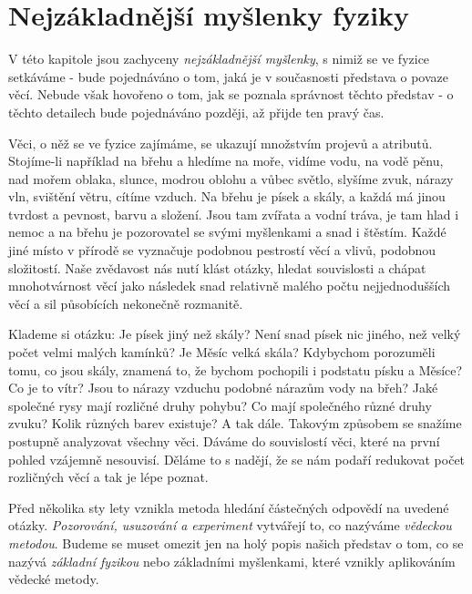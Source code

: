   \section{Nejzákladnější myšlenky fyziky}\label{fyz:IchapIsecII}
    V této kapitole jsou zachyceny \emph{nejzákladnější myšlenky}, s nimiž se ve fyzice setkáváme - 
    bude pojednáváno o tom, jaká je v současnosti představa o povaze věcí. Nebude však hovořeno o 
    tom, jak se poznala správnost těchto představ - o těchto detailech bude pojednáváno později, až 
    přijde ten pravý čas.

    Věci, o něž se ve fyzice zajímáme, se ukazují množstvím projevů a atributů. Stojíme-li 
    například na břehu a hledíme na moře, vidíme vodu, na vodě pěnu, nad mořem oblaka, slunce, 
    modrou oblohu a vůbec světlo, slyšíme zvuk, nárazy vln, svištění větru, cítíme vzduch. Na břehu 
    je písek a skály, a každá má jinou tvrdost a pevnost, barvu a složení. Jsou tam zvířata a vodní 
    tráva, je tam hlad i nemoc a na břehu je pozorovatel se svými myšlenkami a snad i štěstím. 
    Každé jiné místo v přírodě se vyznačuje podobnou pestrostí věcí a vlivů, podobnou složitostí. 
    Naše zvědavost nás nutí klást otázky, hledat souvislosti a chápat mnohotvárnost věcí jako 
    následek snad relativně malého počtu nejjednodušších věcí a sil působících nekonečně rozmanitě.
    
    Klademe si otázku: Je písek jiný než skály? Není snad písek nic jiného, než velký počet velmi 
    malých kamínků? Je Měsíc velká skála? Kdybychom porozuměli tomu, co jsou skály, znamená to, že 
    bychom pochopili i podstatu písku a Měsíce? Co je to vítr? Jsou to nárazy vzduchu podobné 
    nárazům vody na břeh? Jaké společné rysy mají rozličné druhy pohybu? Co mají společného různé 
    druhy zvuku? Kolik různých barev existuje? A tak dále. Takovým způsobem se snažíme postupně 
    analyzovat všechny věci. Dáváme do souvislostí věci, které na první pohled vzájemně nesouvisí. 
    Děláme to s nadějí, že se nám podaří redukovat počet rozličných věcí a tak je lépe poznat.
    
    Před několika sty lety vznikla metoda hledání částečných odpovědí na uvedené otázky. 
    \emph{Pozorování, usuzování a experiment} vytvářejí to, co nazýváme \emph{vědeckou metodou}. 
    Budeme se muset omezit jen na holý popis našich představ o tom, co se nazývá \emph{základní 
    fyzikou} nebo základními myšlenkami, které vznikly aplikováním vědecké metody.
    
